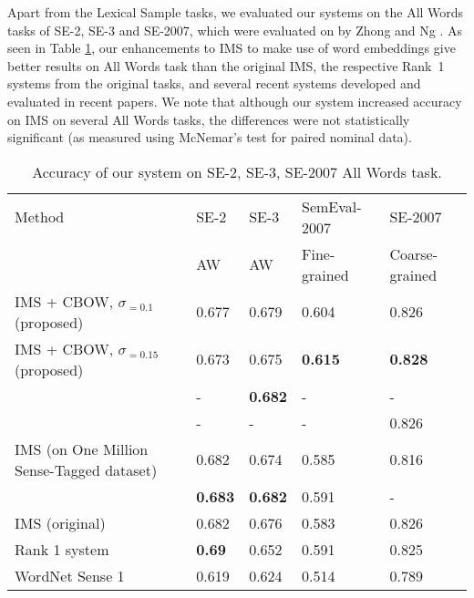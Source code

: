 Apart from the Lexical Sample tasks, we evaluated our systems on the All Words tasks of SE-2, SE-3 and SE-2007, which were evaluated on by Zhong and Ng . As seen in Table \ref{table:All-AW}, our enhancements to IMS to make use of word embeddings give better results on All Words task than the original IMS, the respective Rank~1 systems from the original tasks, and several recent systems developed and evaluated in recent papers. We note that although our system increased accuracy on IMS on several
All Words tasks, the differences were not statistically significant (as measured
using McNemar's test for paired nominal data).

\begin{table}[th]
	\caption{Accuracy of our system on SE-2, SE-3, SE-2007 All Words task.}
	\label{table:All-AW}
	\begin{center}
		\begin{tabular}{| p{4cm} | p{2cm} | p{2cm} | p{2.5cm} | p{2.5cm} | }
			\hline
			Method & SE-2 & SE-3 & SemEval-2007 & 
            SE-2007 \\
			& AW  & AW & Fine-grained &
			Coarse-grained \\
			\hline
			IMS + CBOW, 
			$\sigma _{=0.1}$ (proposed) & 0.677 & 0.679 & 0.604 & 0.826  \\
			\hline
            IMS + 
			CBOW, $\sigma _{=0.15}$ (proposed) & 0.673 & 0.675 & {\bf0.615} & {\bf 0.828 } \\
			\hline
			
			\cite{Taghipour15} & -& {\bf0.682} & - & - \\
			\hline
			\cite{chen2014} & - & - & - & 0.826  \\
			\hline
			IMS (on One Million Sense-Tagged dataset) & 0.682 & 0.674 & 0.585 & 0.816 \\
            \hline
			 \cite{Iacobacci2016}  
            & {\bf0.683} & {\bf0.682} & 0.591 & - \\
			\hline
			IMS (original) & 0.682 & 0.676 & 0.583 & 0.826   \\
			\hline
			Rank 1 system & {\bf0.69} & 0.652 & 0.591 & 0.825  \\
			\hline
			WordNet Sense 1 & 0.619 & 0.624 & 0.514 & 0.789\\
			\hline
		\end{tabular}
	\end{center}
\end{table}


